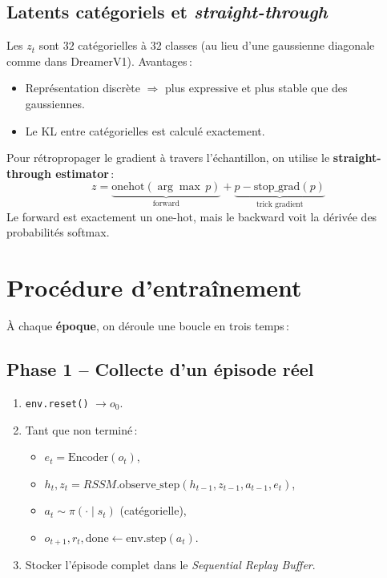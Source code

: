 \documentclass[11pt,a4paper]{article}
\newcommand{\rssm}{RSSM}
\newcommand{\bluebf}[1]{\textbf{\color{enseirbblue}#1}}
\begin{document}
\subsection{Latents catégoriels et \emph{straight-through}}
Les \(z_t\) sont \(32\) catégorielles à \(32\) classes (au lieu d'une
gaussienne diagonale comme dans DreamerV1). Avantages\,:
\begin{itemize}
    \item Représentation discrète \(\Rightarrow\) plus expressive et plus
          stable que des gaussiennes.
    \item Le KL entre catégorielles est calculé exactement.
\end{itemize}
Pour rétropropager le gradient à travers l'échantillon, on utilise le
\bluebf{straight-through estimator}\,:
\begin{equation}
    z = \underbrace{\text{onehot}(\arg\max\, p)}_{\text{forward}}
        + \underbrace{p - \text{stop\_grad}(p)}_{\text{trick gradient}}
\end{equation}
Le forward est exactement un one-hot, mais le backward voit la dérivée des
probabilités softmax.

\section{Procédure d'entraînement}

À chaque \bluebf{époque}, on déroule une boucle en trois temps\,:

\subsection{Phase 1 -- Collecte d'un épisode réel}
\begin{enumerate}
    \item \texttt{env.reset()} \(\to o_0\).
    \item Tant que non terminé\,:
    \begin{itemize}
        \item \(e_t = \text{Encoder}(o_t)\),
        \item \(h_t,z_t = \rssm.\text{observe\_step}(h_{t-1},z_{t-1},a_{t-1},e_t)\),
        \item \(a_t \sim \pi(\cdot\mid s_t)\) (catégorielle),
        \item \(o_{t+1}, r_t, \text{done} \leftarrow \text{env.step}(a_t)\).
    \end{itemize}
    \item Stocker l'épisode complet dans le \emph{Sequential Replay Buffer}.
\end{enumerate}
\end{document}

